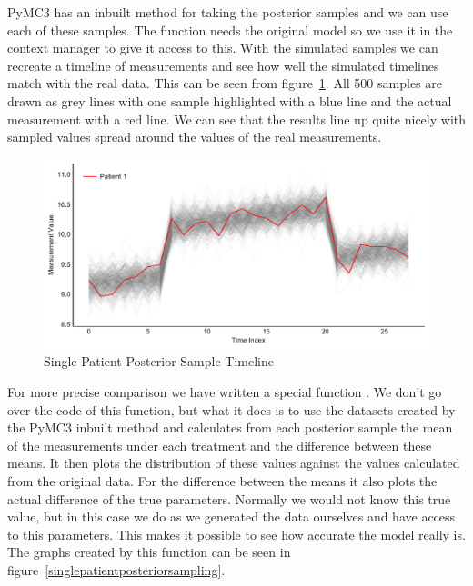 \documentclass[12pt,a4paper,leqno]{report}
\theoremstyle{plain}
\theoremstyle{definition}
\theoremstyle{remark}
\begin{document}
PyMC3 has an inbuilt method for taking the posterior samples and we can use each of
these samples. The function needs the original model so we use it in the context manager
to give it access to this. With the simulated samples we can recreate a timeline of
measurements and see how well the simulated timelines match with the real data.
This can be seen from figure\ \ref{singlepatientposteriortimeline}.
All 500 samples are drawn as grey lines with one sample highlighted with a blue line and
the actual measurement with a red line. We can see that the results line up quite
nicely with sampled values spread around the values of the real measurements.

\bigskip
\begin{figure}[H]
    \caption{Single Patient Posterior Sample Timeline}\label{singlepatientposteriortimeline}
    \bigskip
    \includegraphics[width=\textwidth,height=\textheight,keepaspectratio]{posterior_sample_timeline_single_patient.pdf}
\end{figure}
\bigskip

For more precise comparison we have written a special function
. We don't go over the code of this function,
but what it does is to use the datasets created by the PyMC3 inbuilt method and
calculates from each posterior sample the mean of the measurements under each treatment and the difference between
these means. It then plots the distribution of these values
against the values calculated from the
original data. For the difference between the means it also plots the actual
difference of the true parameters. Normally we would not know
this true value, but in this case we do as we generated the data ourselves and have
access to this parameters. This
makes it possible to see how accurate the model really is. The graphs created by this
function can be seen in figure\ \ref{singlepatientposteriorsampling}.
\end{document}
